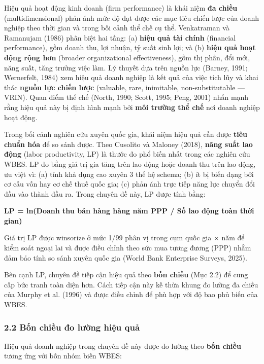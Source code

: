 \documentclass[12pt,a4paper]{article}
\begin{document}
Hiệu quả hoạt động kinh doanh (firm performance) là khái niệm \textbf{đa
chiều} (multidimensional) phản ánh mức độ đạt được các mục tiêu chiến
lược của doanh nghiệp theo thời gian và trong bối cảnh thể chế cụ thể.
Venkatraman và Ramanujam (1986) phân biệt hai tầng: (a) \textbf{hiệu quả
tài chính} (financial performance), gồm doanh thu, lợi nhuận, tỷ suất
sinh lợi; và (b) \textbf{hiệu quả hoạt động rộng hơn} (broader
organizational effectiveness), gồm thị phần, đổi mới, năng suất, tăng
trưởng việc làm. Lý thuyết dựa trên nguồn lực (Barney, 1991; Wernerfelt,
1984) xem hiệu quả doanh nghiệp là kết quả của việc tích lũy và khai
thác \textbf{nguồn lực chiến lược} (valuable, rare, inimitable,
non-substitutable --- VRIN). Quan điểm thể chế (North, 1990; Scott,
1995; Peng, 2001) nhấn mạnh rằng hiệu quả này bị định hình mạnh bởi
\textbf{môi trường thể chế} nơi doanh nghiệp hoạt động.

Trong bối cảnh nghiên cứu xuyên quốc gia, khái niệm hiệu quả cần được
\textbf{tiêu chuẩn hóa} để so sánh được. Theo Cusolito và Maloney
(2018), \textbf{năng suất lao động} (labor productivity, LP) là thước đo
phổ biến nhất trong các nghiên cứu WBES. LP đo bằng giá trị gia tăng
trên lao động hoặc doanh thu trên lao động, ưu việt vì: (a) tính khả
dụng cao xuyên 3 thế hệ schema; (b) ít bị biến dạng bởi cơ cấu vốn hay
cơ chế thuế quốc gia; (c) phản ánh trực tiếp năng lực chuyển đổi đầu vào
thành đầu ra. Trong chuyên đề này, LP được tính bằng:

\textbf{LP = ln(Doanh thu bán hàng hàng năm PPP / Số lao động toàn thời
gian)}

Giá trị LP được winsorize ở mức 1/99 phân vị trong cụm quốc gia × năm để
kiểm soát ngoại lai và được điều chỉnh theo sức mua tương đương (PPP)
nhằm đảm bảo tính so sánh xuyên quốc gia (World Bank Enterprise Surveys,
2025).

Bên cạnh LP, chuyên đề tiếp cận hiệu quả theo \textbf{bốn chiều} (Mục
2.2) để cung cấp bức tranh toàn diện hơn. Cách tiếp cận này kế thừa
khung đo lường đa chiều của Murphy et al. (1996) và được điều chỉnh để
phù hợp với độ bao phủ biến của WBES.

\hypertarget{22-bux1ed1n-chiux1ec1u-ux111o-lux1b0ux1eddng-hiux1ec7u-quux1ea3}{%
\subsubsection{2.2 Bốn chiều đo lường hiệu
quả}\label{22-bux1ed1n-chiux1ec1u-ux111o-lux1b0ux1eddng-hiux1ec7u-quux1ea3}}

Hiệu quả doanh nghiệp trong chuyên đề này được đo lường theo \textbf{bốn
chiều} tương ứng với bốn nhóm biến WBES:
\end{document}
